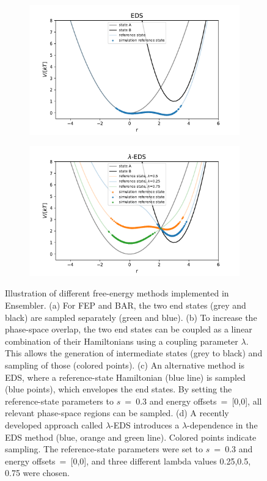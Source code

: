 \begin{figure}[H]
\begin{subfigure}{.45\textwidth}
	\end{subfigure}
	\newline
	\begin{subfigure}{.45\textwidth}
		\caption{}
		\includegraphics[width=\linewidth]{fig/FE_example/EDS_sampling.pdf} 
	\end{subfigure}
	\begin{subfigure}{.45\textwidth}
		\caption{}
		\includegraphics[width=\linewidth]{fig/FE_example/hlEDS_sampling.pdf} 
	\end{subfigure}
	\caption{Illustration of different free-energy methods implemented in Ensembler. (a) For FEP\cite{Zwanzig1954} and BAR\cite{Bennett1976}, the two end states (grey and black) are sampled separately (green and blue). (b) To increase the phase-space overlap, the two end states can be coupled as a linear combination of their Hamiltonians using a coupling parameter $\lambda$. This allows the generation of intermediate states (grey to black) and sampling of those (colored points). (c) An alternative method is EDS,\cite{Christ2007, Christ2008, Christ2009} where a reference-state Hamiltonian (blue line) is sampled (blue points), which envelopes the end states. By setting the reference-state parameters to $s$~=~0.3 and energy offsets~=~[0,0], all relevant phase-space regions can be sampled. (d) A recently developed approach called $\lambda$-EDS\cite{Koenig2020} introduces a $\lambda$-dependence in the EDS method (blue, orange and green line). Colored points indicate sampling. The reference-state parameters were set to $s$~=~0.3 and energy offsets~=~[0,0], and three different lambda values 0.25,0.5, 0.75 were chosen.}
	\label{fig:FE_sampling}
\end{figure}
